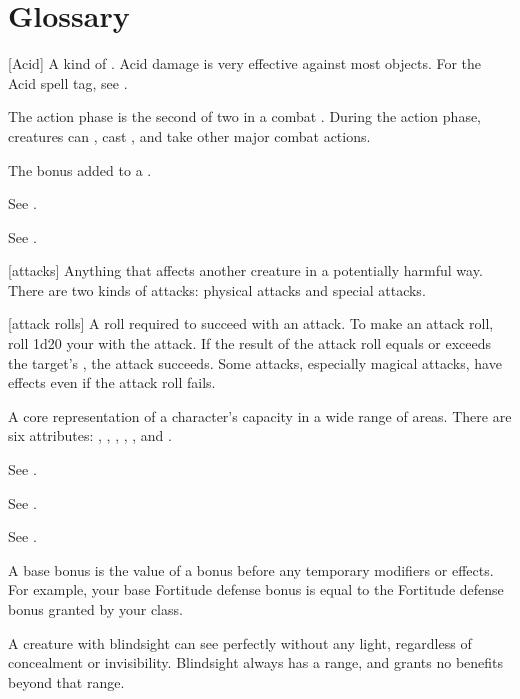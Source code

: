 \chapter{Glossary}\label{Glossary}

[Acid] A kind of . Acid damage is very effective against most objects. For the Acid spell tag, see .

 The action phase is the second of two  in a combat .
During the action phase, creatures can , cast , and take other major combat actions.

 The bonus added to a .

 See .

 See .

[attacks] Anything that affects another creature in a potentially harmful way. There are two kinds of attacks: physical attacks and special attacks.

[attack rolls] A roll required to succeed with an attack.
To make an attack roll, roll 1d20 \add your  with the attack.
If the result of the attack roll equals or exceeds the target's , the attack succeeds.
Some attacks, especially magical attacks, have effects even if the attack roll fails.

 A core representation of a character's capacity in a wide range of areas. There are six attributes: , , , , , and .

 See .

 See .

 See .

 A base bonus is the value of a bonus before any temporary modifiers or effects. For example, your base Fortitude defense bonus is equal to the Fortitude defense bonus granted by your class.

 A creature with blindsight can see perfectly without any light, regardless of concealment or invisibility. Blindsight always has a range, and grants no benefits beyond that range.

